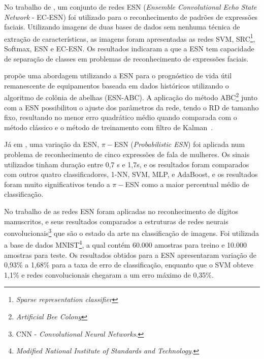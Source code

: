 No trabalho de  , um conjunto de redes ESN (\textit{Ensemble Convolutional Echo State Network} - EC-ESN) foi utilizado para o reconhecimento de padrões de expressões faciais. Utilizando imagens de duas bases de dados sem nenhuma técnica de extração de características, as imagens foram apresentadas as redes SVM, SRC\footnote{\textit{Sparse representation classifier}}, Softmax, ESN e EC-ESN. Os resultados indicaram a que a ESN tem capacidade de separação de classes em problemas de reconhecimento de expressões faciais.

 propõe uma abordagem utilizando a ESN para o prognóstico de vida útil remanescente de equipamentos baseada em dados históricos utilizando o algoritmo de colônia de abelhas (ESN-ABC). A aplicação do método ABC\footnote{\textit{Artificial Bee Colony}} junto com a ESN possibilitou o ajuste dos parâmetros da rede, tendo o RD de tamanho fixo, resultando no menor erro quadrático médio quando comparada com o método clássico e o método de treinamento com filtro de Kalman~\cite[Cap 4]{thesis:aiube2005}.

Já em , uma variação da ESN, $\pi-$ESN (\textit{Probabilistic ESN}) foi aplicada num problema de reconhecimento de cinco expressões de fala de mulheres. Os sinais utilizados tinham duração entre 0,7 s e 1,7s, e os resultados foram comparados com outros quatro classificadores, 1-NN, SVM, MLP, e AdaBoost, e os resultados foram muito significativos tendo a $\pi-$ESN como a maior percentual médio de classificação.

No trabalho de  as redes ESN foram aplicadas no reconhecimento de dígitos manuscritos, e seus resultados comparados a estruturas de redes neurais convolucionais\footnote{CNN - \textit{Convolutional Neural Networks}.} que são o estado da arte na classificação de imagens. Foi utilizada a base de dados MNIST\footnote{\textit{Modified National Institute of Standards and Technology}.}, a qual contém 60.000 amostras para treino e 10.000 amostras para teste. Os resultados obtidos para a ESN apresentaram variação de 0,93\% a 1,68\% para a taxa de erro de classificação, enquanto que o SVM obteve 1,1\% e redes convolucionais chegaram a um erro máximo de 0,35\%.

